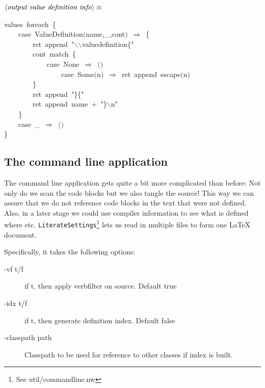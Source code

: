 \documentclass[a4paper,12pt]{article}
\begin{document}
$\left<\mbox{\emph{output value definition info}}\right>\equiv$
\begin{program}values~foreach~{\small\{}
\\~~~~{\vem case}~ValueDefinition$($name,\_,cont$)$~$\Rightarrow$~{\small\{}
\\~~~~~~~~ret~append~"$\backslash$$\backslash$valuedefinition{\small\{}"
\\~~~~~~~~cont~{\vem match}~{\small\{}
\\~~~~~~~~~~~~{\vem case}~None~$\Rightarrow$~$($$)$
\\~~~~~~~~~~~~~~~~{\vem case}~Some$($n$)$~$\Rightarrow$~ret~append~escape$($n$)$
\\~~~~~~~~{\small\}}
\\~~~~~~~~ret~append~"{\small\}}{\small\{}"
\\~~~~~~~~ret~append~name~$+$~"{\small\}}$\backslash$n"
\\~~~~{\small\}}
\\~~~~{\vem case}~\_~$\Rightarrow$~$($$)$
\\{\small\}}
\\[0.5em]\end{program}
\subsection{The command line application}
The command line application gets quite a bit more complicated than before:
Not only do we scan the code blocks but we also tangle the source! This way
we can assure that we do not reference code blocks in the text that were not
defined. Also, in a later stage we could use compiler information to see
what is defined where etc. \texttt{LiterateSettings}\footnote{See util/commandline.nw}
lets us read in multiple files
to form one LaTeX document.

Specifically, it takes the following options:

\begin{description}
\item[-vf t/f] if t, then apply verbfilter on source. Default true
\item[-idx t/f] if t, then generate definition index. Default false
\item[-classpath path] Classpath to be used for reference to other
classes if index is built.
\end{description}
\end{document}
